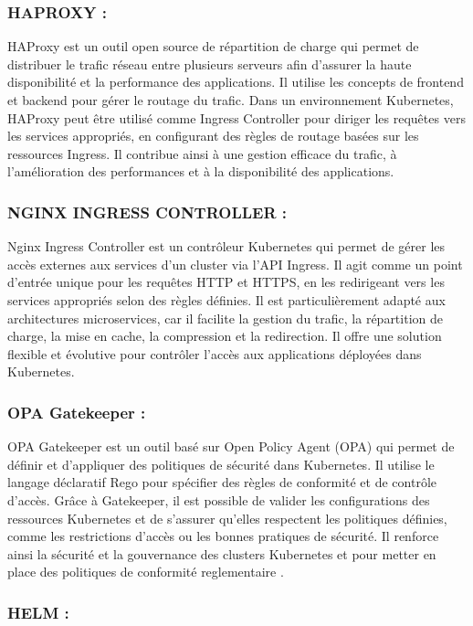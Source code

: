 \subsubsection{HAPROXY :}

HAProxy est un outil open source de répartition de charge qui permet de distribuer le trafic réseau entre plusieurs serveurs afin d’assurer la haute disponibilité et la performance des applications. Il utilise les concepts de frontend et backend pour gérer le routage du trafic. Dans un environnement Kubernetes, HAProxy peut être utilisé comme Ingress Controller pour diriger les requêtes vers les services appropriés, en configurant des règles de routage basées sur les ressources Ingress. Il contribue ainsi à une gestion efficace du trafic, à l’amélioration des performances et à la disponibilité des applications.

\subsubsection{NGINX INGRESS CONTROLLER :}

Nginx Ingress Controller est un contrôleur Kubernetes qui permet de gérer les accès externes aux services d’un cluster via l’API Ingress. Il agit comme un point d’entrée unique pour les requêtes HTTP et HTTPS, en les redirigeant vers les services appropriés selon des règles définies. Il est particulièrement adapté aux architectures microservices, car il facilite la gestion du trafic, la répartition de charge, la mise en cache, la compression et la redirection. Il offre une solution flexible et évolutive pour contrôler l’accès aux applications déployées dans Kubernetes.

\subsubsection{OPA Gatekeeper :}

OPA Gatekeeper est un outil basé sur Open Policy Agent (OPA) qui permet de définir et d’appliquer des politiques de sécurité dans Kubernetes. Il utilise le langage déclaratif Rego pour spécifier des règles de conformité et de contrôle d’accès. Grâce à Gatekeeper, il est possible de valider les configurations des ressources Kubernetes et de s’assurer qu’elles respectent les politiques définies, comme les restrictions d’accès ou les bonnes pratiques de sécurité. Il renforce ainsi la sécurité et la gouvernance des clusters Kubernetes et pour metter en place des politiques de conformité reglementaire .
\subsubsection{HELM :}

